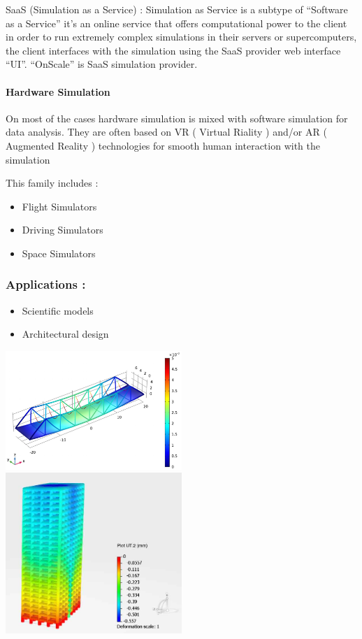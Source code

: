 \documentclass[
  14pt,
  english,
  a4paper,
]{scrreprt}
\providecommand{\tightlist}{%
  \setlength{\itemsep}{0pt}\setlength{\parskip}{0pt}}
\begin{document}
SaaS (Simulation as a Service) : Simulation as Service is a subtype of
``Software as a Service'' it's an online service that offers
computational power to the client in order to run extremely complex
simulations in their servers or supercomputers, the client interfaces
with the simulation using the SaaS provider web interface ``UI''.
``OnScale'' is SaaS simulation provider.

\hypertarget{hardware-simulation}{%
\paragraph{Hardware Simulation}\label{hardware-simulation}}

On most of the cases hardware simulation is mixed with software
simulation for data analysis. They are often based on VR ( Virtual
Riality ) and/or AR ( Augmented Reality ) technologies for smooth human
interaction with the simulation

This family includes :

\begin{itemize}
\tightlist
\item
  Flight Simulators
\item
  Driving Simulators
\item
  Space Simulators
\end{itemize}

\hypertarget{applications}{%
\subsubsection{Applications :}\label{applications}}

\begin{itemize}
\item
  Scientific models
\item
  Architectural design
\end{itemize}

\includegraphics[width=0.5\textwidth,height=\textheight]{figures/Bridge-weightsim.png}
\includegraphics[width=0.5\textwidth,height=\textheight]{figures/Architecturalsim2.jpg}
\end{document}
